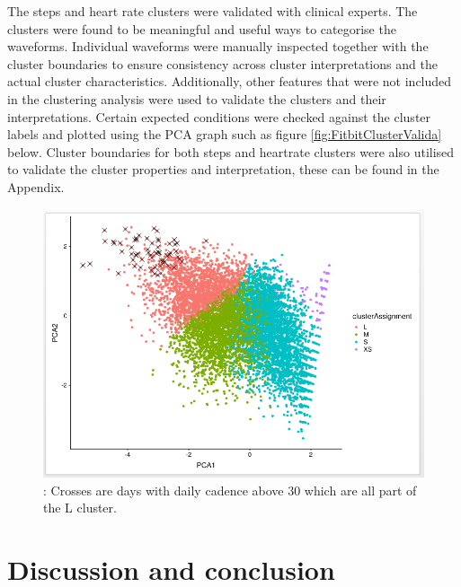 \documentclass{article}
\begin{document}
The steps and heart rate clusters were validated with clinical experts. The clusters were found to be meaningful and useful ways to categorise the waveforms. Individual waveforms were manually inspected together with the cluster boundaries to ensure consistency across cluster interpretations and the actual cluster characteristics. Additionally, other features that were not included in the clustering analysis were used to validate the clusters and their interpretations. Certain expected conditions were checked against the cluster labels and plotted using the PCA graph such as figure \ref{fig:FitbitClusterValida} below. Cluster boundaries for both steps and heartrate clusters were also utilised to validate the cluster properties and interpretation, these can be found in the Appendix. 

\begin{figure}[!htb]
  \centering
  \includegraphics[]{FitbitClusterValidation.png}
  \caption{: Crosses are days with daily cadence above 30 which are all part of the L cluster.}
  \label{fig:FitbitClusterValidation}
\end{figure}


\section{Discussion and conclusion} 
\end{document}
